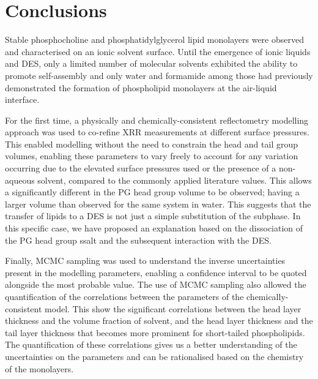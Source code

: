 \section{Conclusions}
Stable phosphocholine and phosphatidylglycerol lipid monolayers were observed and characterised on an ionic solvent surface.
Until the emergence of ionic liquids and DES, only a limited number of molecular solvents exhibited the ability to promote self-assembly and only water and formamide among those had previously demonstrated the formation of phospholipid monolayers at the air-liquid interface.

For the first time, a physically and chemically-consistent reflectometry modelling approach was used to co-refine XRR measurements at different surface pressures.
This enabled modelling without the need to constrain the head and tail group volumes, enabling these parameters to vary freely to account for any variation occurring due to the elevated surface pressures used or the presence of a non-aqueous solvent, compared to the commonly applied literature values.
This allows a significantly different in the PG head group volume to be observed; having a larger volume than observed for the same system in water.
This suggests that the transfer of lipids to a DES is not just a simple substitution of the subphase.
In this specific case, we have proposed an explanation based on the dissociation of the PG head group ssalt and the subsequent interaction with the DES.

Finally, MCMC sampling was used to understand the inverse uncertainties present in the modelling parameters, enabling a confidence interval to be quoted alongside the most probable value.
The use of MCMC sampling also allowed the quantification of the correlations between the parameters of the chemically-consistent model.
This show the significant correlations between the head layer thickness and the volume fraction of solvent, and the head layer thickness and the tail layer thickness that becomes more prominent for short-tailed phospholipids.
The quantification of these correlations gives us a better understanding of the uncertainties on the parameters and can be rationalised based on the chemistry of the monolayers.
